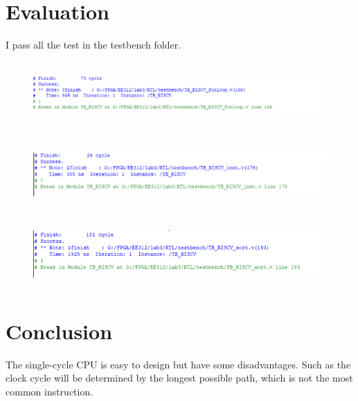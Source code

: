 \documentclass[12pt,a4paper]{article}
\begin{document}
\section{Evaluation}

I pass all the test in the testbench folder.

\begin{figure}[H]
  \centering
  \includegraphics[height=1in]{1.PNG}
  \end{figure}

\begin{figure}[H]
  \centering
  \includegraphics[height=1in]{2.PNG}
  \end{figure}

  \begin{figure}[H]
    \centering
    \includegraphics[height=1in]{3.PNG}
    \end{figure}


\section{Conclusion}

The single-cycle CPU is easy to design but have some disadvantages.
Such as the clock cycle will be determined by the longest possible path, which is not the most common instruction. 
\end{document}
